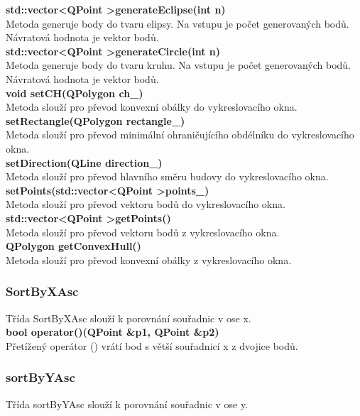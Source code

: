 \documentclass[a4paper, 12pt]{article}
\begin{document}
\textbf{std::vector\textless QPoint \textgreater generateEclipse(int n)}\\
Metoda generuje body do tvaru elipsy. Na vstupu je počet generovaných bodů. Návratová hodnota je vektor bodů.\\

\textbf{std::vector\textless QPoint \textgreater generateCircle(int n)}\\
Metoda generuje body do tvaru kruhu. Na vstupu je počet generovaných bodů. Návratová hodnota je vektor bodů.\\

\textbf{void setCH(QPolygon ch\_)}\\
Metoda slouží pro převod konvexní obálky do vykreslovacího okna.\\

\textbf{setRectangle(QPolygon rectangle\_)}\\
Metoda slouží pro převod minimální ohraničujícího obdélníku do vykreslovacího okna.\\

\textbf{setDirection(QLine direction\_)}\\
Metoda slouží pro převod hlavního směru budovy do vykreslovacího okna.\\

\textbf{setPoints(std::vector\textless QPoint \textgreater points\_)}\\
Metoda slouží pro převod vektoru bodů do vykreslovacího okna.\\

\textbf{std::vector\textless QPoint \textgreater getPoints()}\\
Metoda slouží pro převod vektoru bodů z vykreslovacího okna.\\

\textbf{QPolygon getConvexHull()}\\
Metoda slouží pro převod konvexní obálky z vykreslovacího okna.

\subsubsection{SortByXAsc}
Třída SortByXAsc slouží k porovnání souřadnic v ose x.\\


\textbf{bool operator()(QPoint \&p1, QPoint \&p2)}\\
Přetížený operátor () vrátí bod s větší souřadnicí x z dvojice bodů.\\


\subsubsection{sortByYAsc}
Třída sortByYAsc slouží k porovnání souřadnic v ose y.
\\
\end{document}
